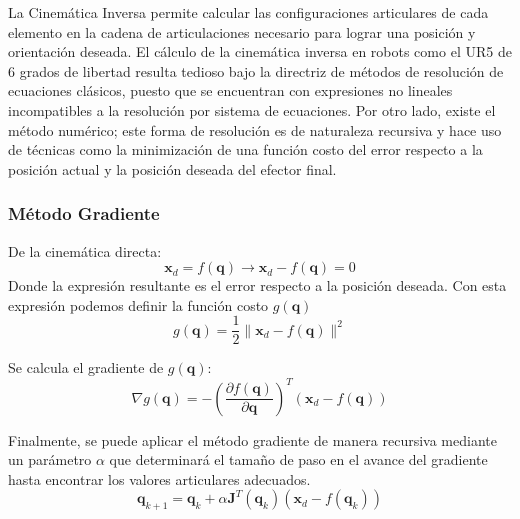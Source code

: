 La Cinemática Inversa permite calcular las configuraciones articulares de
cada elemento en la cadena de articulaciones necesario para lograr una posición
y orientación deseada.
El cálculo de la cinemática inversa en robots como el UR5 de 6 grados de
libertad resulta tedioso bajo la directriz de métodos de resolución de
ecuaciones clásicos, puesto que se encuentran con expresiones no lineales
incompatibles a la resolución por sistema de ecuaciones. Por otro lado, existe
el método numérico; este forma de resolución es de naturaleza recursiva y hace
uso de técnicas como la minimización de una función costo del error respecto a
la posición actual y la posición deseada del efector final.


\subsubsection{Método Gradiente}
De la cinemática directa:
\begin{equation*}
    \boldsymbol{x}_d = f(\boldsymbol{q}) \longrightarrow \boldsymbol{x}_d -
    f(\boldsymbol{q}) = 0
\end{equation*}
Donde la expresión resultante es el error respecto a la posición deseada.
Con esta expresión podemos definir la función costo $g(\boldsymbol{q})$
\begin{equation*}
    g(\boldsymbol{q}) = \frac{1}{2} \|\boldsymbol{x}_d -
    f(\boldsymbol{q})\|^2
\end{equation*}

Se calcula el gradiente de $g(\boldsymbol{q})$:
\begin{equation*}
    \nabla g(\boldsymbol{q}) = -(\frac{\partial f(\boldsymbol{q})}{\partial
        \boldsymbol{q}})^T (\boldsymbol{x}_d - f(\boldsymbol{q}))
\end{equation*}

Finalmente, se puede aplicar el método gradiente de manera recursiva
mediante un parámetro $\alpha$ que determinará el tamaño de paso en el avance
del gradiente hasta encontrar los valores articulares adecuados.
\begin{equation}
    \boldsymbol{q}_{k+1} = \boldsymbol{q}_k + \alpha\boldsymbol{J}^T
    (\boldsymbol{q}_k)(\boldsymbol{x}_d-f(\boldsymbol{q}_k))
\end{equation}

